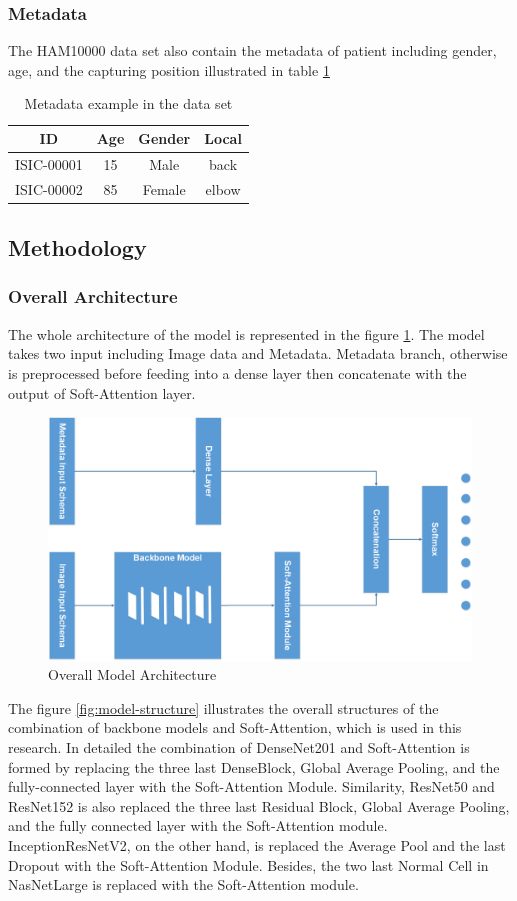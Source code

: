\documentclass[sensors,article,submit,pdftex,moreauthors]{Definitions/mdpi}
\begin{document}
\subsubsection{Metadata}
The HAM10000 data set \cite{10417} also contain the metadata of patient including gender, age, and the capturing position illustrated in table \ref{table:metadata sample}
\begin{table}[H]
	\centering
	\begin{tabular}{|c c c c |} 
		\hline
		ID & Age & Gender & Local\\ 
		\hline
		ISIC-00001 & 15 & Male & back\\
		\hline
		ISIC-00002 & 85 & Female & elbow\\
		\hline
	\end{tabular}
	\caption{Metadata example in the data set}
	\label{table:metadata sample}
\end{table}
\subsection{Methodology}
\subsubsection{Overall Architecture}
The whole architecture of the model is represented in the figure \ref{fig:main-model}. The model takes two input including Image data and Metadata. Metadata branch, otherwise is preprocessed before feeding into a dense layer then concatenate with the output of Soft-Attention layer. 

\begin{figure}[H]
	\centering
	\includegraphics[width=0.5\linewidth]{Definitions/MainModel - Model Form}
	\caption{Overall Model Architecture}
	\label{fig:main-model}
\end{figure}

The figure \ref{fig:model-structure} illustrates the overall structures of the combination of backbone models and Soft-Attention, which is used in this research. In detailed the combination of DenseNet201 and Soft-Attention is formed by replacing the three last DenseBlock, Global Average Pooling, and the fully-connected layer with the Soft-Attention Module. Similarity, ResNet50 and ResNet152 is also replaced the three last Residual Block, Global Average Pooling, and the fully connected layer with the Soft-Attention module. InceptionResNetV2, on the other hand, is replaced the Average Pool and the last Dropout with the Soft-Attention Module. Besides, the two last Normal Cell in NasNetLarge is replaced with the Soft-Attention module. 
\end{document}

